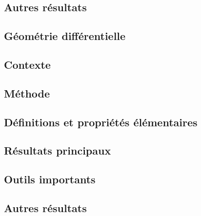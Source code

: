 \documentclass[12pt,a4paper]{article}
\begin{document}
\subsection*{Autres résultats}


\newpage
\begin{center}  
\section*{Géométrie différentielle} 
\end{center}


\subsection*{Contexte}

\subsection*{Méthode}

\subsection*{Définitions et propriétés élémentaires}

\subsection*{Résultats principaux}

\subsection*{Outils importants}


\subsection*{Autres résultats}
\end{document}
